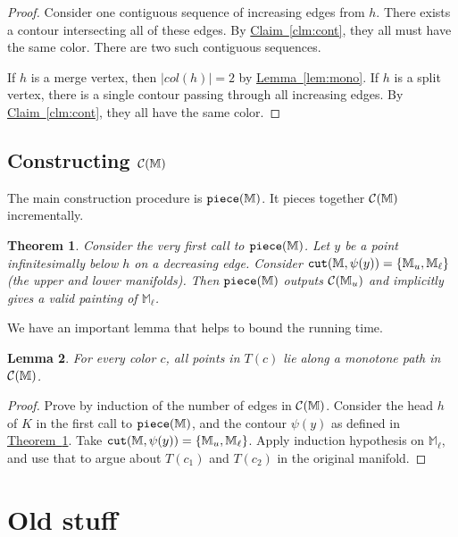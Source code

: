 \documentclass[11pt]{article}
\newtheorem{theorem}{Theorem}
\newtheorem{lemma}[theorem]{Lemma}
\theoremstyle{definition}
\newcommand{\cC}{{\cal C}}
\newcommand{\MM}{\mathbb{M}}
\newcommand{\Clm}[1]{\hyperref[clm:#1]{Claim~\ref*{clm:#1}}} %
\newcommand{\Thm}[1]{\hyperref[thm:#1]{Theorem~\ref*{thm:#1}}} %
\newcommand{\Lem}[1]{\hyperref[lem:#1]{Lemma~\ref*{lem:#1}}} %
\newcommand{\col}{col}
\newcommand{\cut}{{\tt cut}}
\newcommand{\cont}{\psi}
\newcommand{\onestep}{{\tt piece}}
\newcommand{\reeb}{\cC}
\newcommand{\st}{K}
\begin{document}
{\begin{proof} Consider one contiguous sequence of increasing edges from $h$.
There exists a contour intersecting all of these edges. By \Clm{cont}, they all
must have the same color. There are two such contiguous sequences.

If $h$ is a merge vertex, then $|\col(h)| = 2$ by \Lem{mono}. If $h$ is a split vertex,
there is a single contour passing through all increasing edges. By \Clm{cont}, they
all have the same color.
\end{proof}

\subsection{Constructing $\reeb(\MM)$} \label{sec:const}

The main construction procedure is $\onestep(\MM)$. It pieces together $\reeb(\MM)$
incrementally. 


\medskip
\begin{theorem} \label{thm:piece} Consider the very first call to $\onestep(\MM)$. Let $y$ be a point
infinitesimally below $h$ on a decreasing edge. Consider $\cut(\MM,\cont(y)) = \{\MM_u,\MM_\ell\}$ (the upper and lower manifolds). Then $\onestep(\MM)$
outputs $\reeb(\MM_u)$ and implicitly gives a valid painting of $\MM_\ell$.
\end{theorem}

We have an important lemma that helps to bound the running time.

\begin{lemma} \label{lem:tree} For every color $c$, all points in $T(c)$ lie along a monotone path in 
$\reeb(\MM)$.
\end{lemma}

\begin{proof} Prove by induction of the number of edges in $\reeb(\MM)$. Consider the head $h$ of $\st$ in the first call to $\onestep(\MM)$,
and the contour $\cont(y)$ as defined in \Thm{piece}. Take $\cut(\MM,\cont(y)) = \{\MM_u,\MM_\ell\}$. Apply induction
hypothesis on $\MM_\ell$, and use that to argue about $T(c_1)$ and $T(c_2)$ in the original manifold.
\end{proof}



\pagebreak
}

\appendix

\section{Old stuff}
\end{document}

